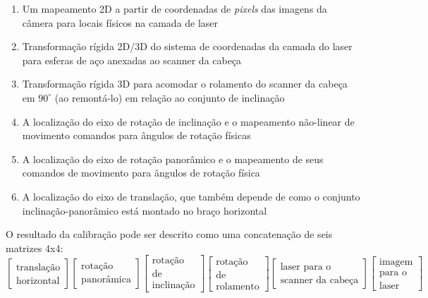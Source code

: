 \begin{enumerate}
\item{Um mapeamento 2D a partir de coordenadas de \emph{pixels} das imagens da câmera para locais físicos na camada de laser}
\item{Transformação rígida 2D/3D do sistema de coordenadas da camada do laser para esferas de aço anexadas ao scanner da cabeça}
\item{Transformação rígida 3D para acomodar o rolamento do scanner da cabeça em $90^{\circ}$ (ao remontá-lo) em relação ao conjunto de inclinação}
\item{A localização do eixo de rotação de inclinação e o mapeamento não-linear de movimento comandos para ângulos de rotação físicas}
\item{A localização do eixo de rotação panorâmico e o mapeamento de seus comandos de movimento para ângulos de rotação física}
\item{A localização do eixo de translação, que também depende de como o conjunto inclinação-panorâmico está montado no braço horizontal}
\end{enumerate}

O resultado da calibração pode ser descrito como uma concatenação de seis matrizes 4x4:
\[
\begin{bmatrix}
\text{translação} \\ 
\text{horizontal}
\end{bmatrix}
\begin{bmatrix}
\text{rotação} \\ 
\text{panorâmica}
\end{bmatrix}
\begin{bmatrix}
\text{rotação} \\
\text{de} \\
\text{inclinação}
\end{bmatrix}
\begin{bmatrix}
\text{rotação} \\
\text{de} \\
\text{rolamento}
\end{bmatrix}
\begin{bmatrix}
\text{laser para o} \\
\text{scanner }
\text{da cabeça}
\end{bmatrix}
\begin{bmatrix}
\text{imagem} \\
\text{para o} \\
\text{laser}
\end{bmatrix}
\]

